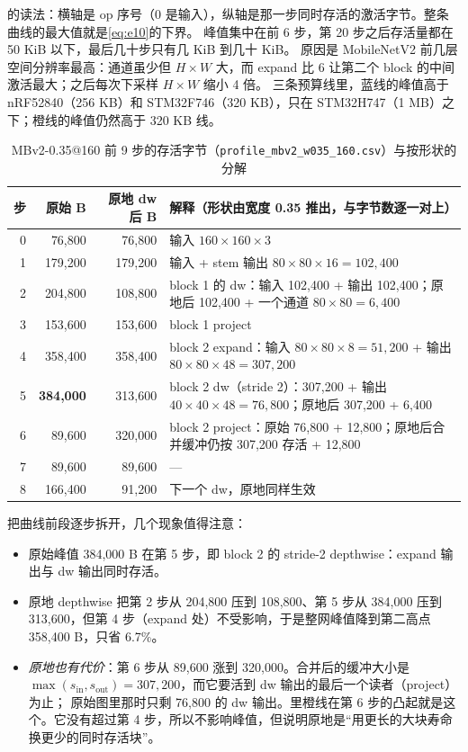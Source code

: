 \documentclass[11pt,a4paper]{ctexart}
\begin{document}
的读法：横轴是 op 序号（0 是输入），纵轴是那一步同时存活的激活字节。整条曲线的最大值就是\cref{eq:e10}的下界。
峰值集中在前 6 步，第 20 步之后存活量都在 50 KiB 以下，最后几十步只有几 KiB 到几十 KiB。
原因是 MobileNetV2 前几层空间分辨率最高：通道虽少但 $H\times W$ 大，而 expand 比 6 让第二个 block 的中间激活最大；之后每次下采样 $H\times W$ 缩小 4 倍。
三条预算线里，蓝线的峰值高于 nRF52840（256 KB）和 STM32F746（320 KB），只在 STM32H747（1 MB）之下；橙线的峰值仍然高于 320 KB 线。

\begin{table}[H]
\centering\small
\caption{MBv2-0.35@160 前 9 步的存活字节（\texttt{profile\_mbv2\_w035\_160.csv}）与按形状的分解}\label{tab:profile}
\begin{tabularx}{\linewidth}{rrr >{\raggedright\arraybackslash}X}
\toprule
步 & 原始 B & 原地 dw 后 B & 解释（形状由宽度 0.35 推出，与字节数逐一对上） \\
\midrule
0 & 76,800 & 76,800 & 输入 $160\times160\times3$ \\
1 & 179,200 & 179,200 & 输入 + stem 输出 $80\times80\times16=102{,}400$ \\
2 & 204,800 & 108,800 & block 1 的 dw：输入 102,400 + 输出 102,400；原地后 102,400 + 一个通道 $80\times80=6{,}400$ \\
3 & 153,600 & 153,600 & block 1 project \\
4 & 358,400 & 358,400 & block 2 expand：输入 $80\times80\times8=51{,}200$ + 输出 $80\times80\times48=307{,}200$ \\
5 & \textbf{384,000} & 313,600 & block 2 dw（stride 2）：307,200 + 输出 $40\times40\times48=76{,}800$；原地后 307,200 + 6,400 \\
6 & 89,600 & 320,000 & block 2 project：原始 76,800 + 12,800；原地后合并缓冲仍按 307,200 存活 + 12,800 \\
7 & 89,600 & 89,600 & — \\
8 & 166,400 & 91,200 & 下一个 dw，原地同样生效 \\
\bottomrule
\end{tabularx}
\end{table}

把曲线前段逐步拆开，几个现象值得注意：
\begin{itemize}
  \item 原始峰值 384,000 B 在第 5 步，即 block 2 的 stride-2 depthwise：expand 输出与 dw 输出同时存活。
  \item 原地 depthwise 把第 2 步从 204,800 压到 108,800、第 5 步从 384,000 压到 313,600，但第 4 步（expand 处）不受影响，于是整网峰值降到第二高点 358,400 B，只省 6.7\%。
  \item \emph{原地也有代价}：第 6 步从 89,600 涨到 320,000。合并后的缓冲大小是 $\max(s_\text{in}, s_\text{out})=307{,}200$，而它要活到 dw 输出的最后一个读者（project）为止；
        原始图里那时只剩 76,800 的 dw 输出。里橙线在第 6 步的凸起就是这个。它没有超过第 4 步，所以不影响峰值，但说明原地是“用更长的大块寿命换更少的同时存活块”。
\end{itemize}
\end{document}
